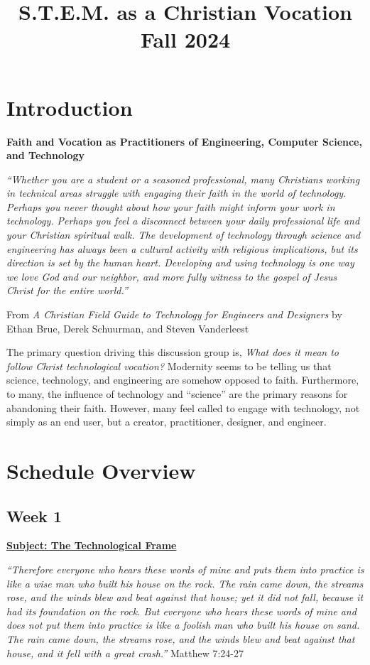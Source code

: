 \documentclass[11pt]{article}
\date{}
\title{S.T.E.M. as a Christian Vocation\\\medskip
\large Fall 2024}
\let\oldsection\section
\renewcommand\section{\clearpage\oldsection}
\begin{document}
\maketitle
\section*{Introduction}
\label{sec:org2d34683}
\begin{center}
\textbf{Faith and Vocation as Practitioners of Engineering, Computer Science, and
 Technology}
\end{center}

\emph{``Whether you are a student or a seasoned professional, many Christians working
in technical areas struggle with engaging their faith in the world of
technology. Perhaps you never thought about how your faith might inform your
work in technology. Perhaps you feel a disconnect between your daily
professional life and your Christian spiritual walk. The development of
technology through science and engineering has always been a cultural activity
with religious implications, but its direction is set by the human heart.
Developing and using technology is one way we love God and our neighbor, and
more fully witness to the gospel of Jesus Christ for the entire world.''}
\begin{flushright}
From \emph{A Christian Field Guide to Technology for Engineers and Designers} by
Ethan Brue, Derek Schuurman, and Steven Vanderleest
\end{flushright}

The primary question driving this discussion group is, \emph{What does it mean to
follow Christ technological vocation?} Modernity seems to be telling us that
science, technology, and engineering are somehow opposed to faith. Furthermore,
to many, the influence of technology and ``science'' are the primary reasons for
abandoning their faith. However, many feel called to engage with technology, not
simply as an end user, but a creator, practitioner, designer, and engineer.
\section*{Schedule Overview}
\label{sec:org514a532}
\subsection*{Week 1}
\label{sec:org6c833af}
\textbf{\uline{Subject: The Technological Frame}}
\begin{mdframed}[nobreak=true]
\emph{“Therefore everyone who hears these words of mine and puts them into practice
is like a wise man who built his house on the rock. The rain came down, the
streams rose, and the winds blew and beat against that house; yet it did not
fall, because it had its foundation on the rock. But everyone who hears these
words of mine and does not put them into practice is like a foolish man who
built his house on sand. The rain came down, the streams rose, and the winds
blew and beat against that house, and it fell with a great crash.”} Matthew
7:24-27
\end{mdframed}
\end{document}
